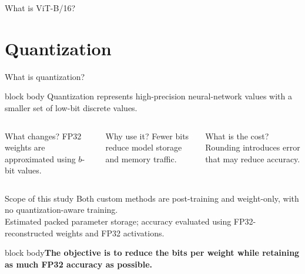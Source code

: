 \documentclass[aspectratio=169,10pt]{beamer}
\newcommand{\takeaway}[1]{\vfill\begin{beamercolorbox}[wd=\textwidth,sep=1.5mm,rounded=true]{block body}\centering\small\bfseries #1\end{beamercolorbox}}
\begin{document}
\begin{frame}{What is ViT-B/16?}
{}
\par\vspace{1mm}{\scriptsize CIFAR-10: 10,000 test images; 95.73\% FP32 accuracy.\hfill Dosovitskiy et al., 2021}
\end{frame}

\section{Quantization}
\begin{frame}{What is quantization?}
\begin{beamercolorbox}[wd=\textwidth,sep=2.5mm,rounded=true]{block body}
\centering\large
Quantization represents high-precision neural-network values with a smaller set of low-bit discrete values.
\end{beamercolorbox}
\vspace{2mm}
\begin{columns}[T,onlytextwidth]
\begin{block}{What changes?}
\centering\small
FP32 weights are approximated using $b$-bit values.
\end{block}
\begin{block}{Why use it?}
\centering\small
Fewer bits reduce model storage and memory traffic.
\end{block}
\begin{block}{What is the cost?}
\centering\small
Rounding introduces error that may reduce accuracy.
\end{block}
\end{columns}
\vspace{2mm}
\begin{alertblock}{Scope of this study}
\centering\small
Both custom methods are post-training and weight-only, with no quantization-aware training.\\
\scriptsize Estimated packed parameter storage; accuracy evaluated using FP32-reconstructed weights and FP32 activations.
\end{alertblock}
\takeaway{The objective is to reduce the bits per weight while retaining as much FP32 accuracy as possible.}
\end{frame}
\end{document}
